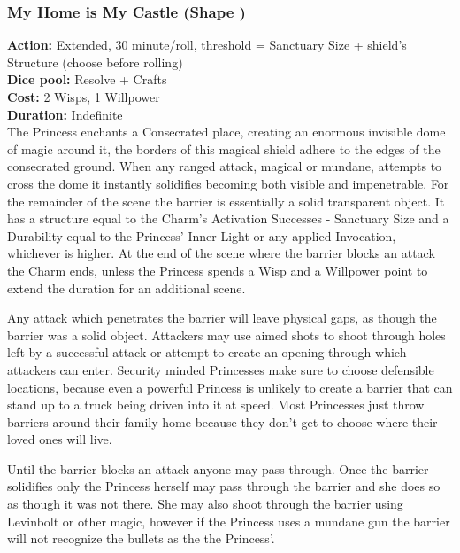 \subsubsection*{My Home is My Castle (Shape \textbullet\textbullet\textbullet)}

\textbf{Action:} Extended, 30 minute/roll, threshold = Sanctuary Size + shield’s Structure (choose before rolling)\\
\textbf{Dice pool:} Resolve + Crafts\\
\textbf{Cost:} 2 Wisps, 1 Willpower\\
\textbf{Duration:} Indefinite\\

\noindent The Princess enchants a Consecrated place, creating an enormous invisible dome of magic around it, the borders of this magical shield adhere to the edges of the consecrated ground. When any ranged attack, magical or mundane, attempts to cross the dome it instantly solidifies becoming both visible and impenetrable. For the remainder of the scene the barrier is essentially a solid transparent object. It has a structure equal to the Charm's Activation Successes - Sanctuary Size and a Durability equal to the Princess' Inner Light or any applied Invocation, whichever is higher. At the end of the scene where the barrier blocks an attack the Charm ends, unless the Princess spends a Wisp and a Willpower point to extend the duration for an additional scene. 

Any attack which penetrates the barrier will leave physical gaps, as though the barrier was a solid object. Attackers may use aimed shots to shoot through holes left by a successful attack or attempt to create an opening through which attackers can enter. Security minded Princesses make sure to choose defensible locations, because even a powerful Princess is unlikely to create a barrier that can stand up to a truck being driven into it at speed. Most Princesses just throw barriers around their family home because they don't get to choose where their loved ones will live. 

Until the barrier blocks an attack anyone may pass through. Once the barrier solidifies only the Princess herself may pass through the barrier and she does so as though it was not there. She may also shoot through the barrier using Levinbolt or other magic, however if the Princess uses a mundane gun the barrier will not recognize the bullets as the the Princess'. 

